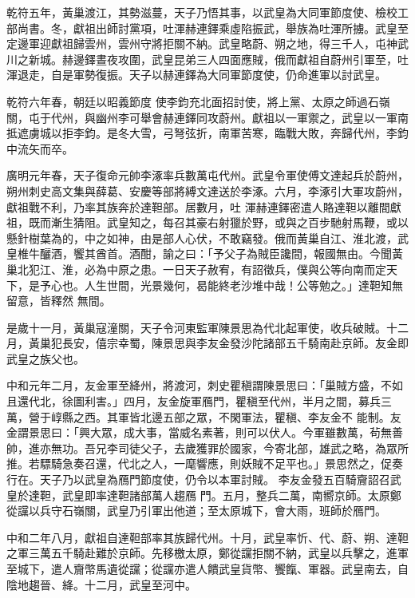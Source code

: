 \begin{pinyinscope}
 乾符五年，黃巢渡江，其勢滋蔓，天子乃悟其事，以武皇為大同軍節度使、檢校工部尚書。冬，獻祖出師討黨項，吐渾赫連鐸乘虛陷振武，舉族為吐渾所擄。武皇至定邊軍迎獻祖歸雲州，雲州守將拒關不納。武皇略蔚、朔之地，得三千人，屯神武川之新城。赫邊鐸晝夜攻圍，武皇昆弟三人四面應賊，俄而獻祖自蔚州引軍至，吐渾退走，自是軍勢復振。天子以赫連鐸為大同軍節度使，仍命進軍以討武皇。



 乾符六年春，朝廷以昭義節度
 使李鈞充北面招討使，將上黨、太原之師過石嶺關，屯于代州，與幽州李可舉會赫連鐸同攻蔚州。獻祖以一軍禦之，武皇以一軍南抵遮虜城以拒李鈞。是冬大雪，弓弩弦折，南軍苦寒，臨戰大敗，奔歸代州，李鈞中流矢而卒。



 廣明元年春，天子復命元帥李涿率兵數萬屯代州。武皇令軍使傅文達起兵於蔚州，朔州刺史高文集與薛葛、安慶等部將縛文達送於李涿。六月，李涿引大軍攻蔚州，獻祖戰不利，乃率其族奔於達靼部。居數月，吐
 渾赫連鐸密遣人賂達靼以離間獻祖，既而漸生猜阻。武皇知之，每召其豪右射獵於野，或與之百步馳射馬鞭，或以懸針樹葉為的，中之如神，由是部人心伏，不敢竊發。俄而黃巢自江、淮北渡，武皇椎牛釃酒，饗其酋首。酒酣，諭之曰：「予父子為賊臣讒間，報國無由。今聞黃巢北犯江、淮，必為中原之患。一日天子赦宥，有詔徵兵，僕與公等向南而定天下，是予心也。人生世間，光景幾何，曷能終老沙堆中哉！公等勉之。」達靼知無留意，皆釋然
 無間。


是歲十一月，黃巢寇潼關，天子令河東監軍陳景思為代北起軍使，收兵破賊。十二月，黃巢犯長安，僖宗幸蜀，陳景思與李友金發沙陀諸部五千騎南赴京師。友金即武皇之族父也。


中和元年二月，友金軍至絳州，將渡河，刺史瞿稹謂陳景思曰：「巢賊方盛，不如且還代北，徐圖利害。」四月，友金旋軍鴈門，瞿稹至代州，半月之間，募兵三萬，營于崞縣之西。其軍皆北邊五部之眾，不閑軍法，瞿稹、李友金不
 能制。友金謂景思曰：「興大眾，成大事，當威名素著，則可以伏人。今軍雖數萬，茍無善帥，進亦無功。吾兄李司徒父子，去歲獲罪於國家，今寄北部，雄武之略，為眾所推。若驃騎急奏召還，代北之人，一麾響應，則妖賊不足平也。」景思然之，促奏行在。天子乃以武皇為鴈門節度使，仍令以本軍討賊。
 李友金發五百騎齎詔召武皇於達靼，武皇即率達靼諸部萬人趨鴈
 門。五月，整兵二萬，南嚮京師。太原鄭從讜以兵守石嶺關，武皇乃引軍出他道；至太原城下，會大雨，班師於鴈門。



 中和二年八月，獻祖自達靼部率其族歸代州。十月，武皇率忻、代、蔚、朔、達靼之軍三萬五千騎赴難於京師。先移檄太原，鄭從讜拒關不納，武皇以兵擊之，進軍至城下，遣人齎幣馬遺從讜；從讜亦遣人饋武皇貨幣、饗餼、軍器。武皇南去，自陰地趨晉、絳。十二月，武皇至河中。




\end{pinyinscope}
